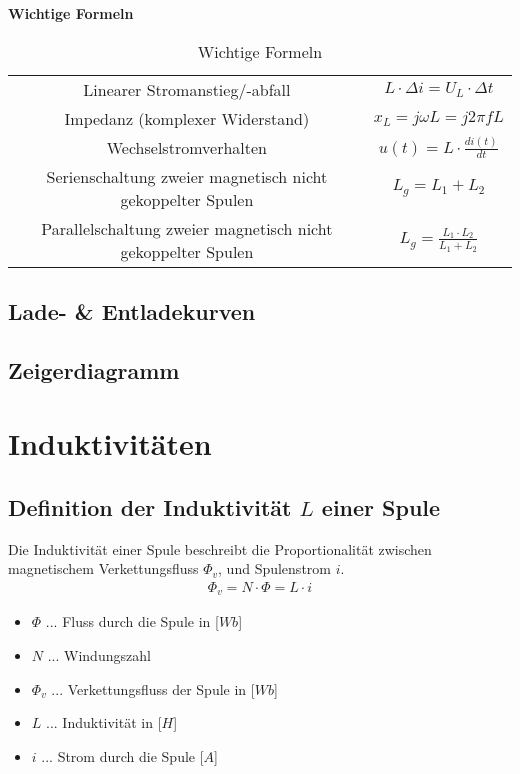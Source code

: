 \textbf{Wichtige Formeln} \\
\begin{table}[!htb]
    \centering
    \begin{tabular}{|c|c|}
        \hline
        Linearer Stromanstieg/-abfall & $L\cdot \Delta i = U_L \cdot \Delta t$ \\
        Impedanz (komplexer Widerstand) & $x_L = j\omega L = j2\pi fL$ \\
        Wechselstromverhalten & $u(t) = L\cdot \frac{di(t)}{dt}$ \\
        Serienschaltung zweier magnetisch nicht gekoppelter Spulen& $L_{g}=L_1+L_2$ \\
        Parallelschaltung zweier magnetisch nicht gekoppelter Spulen& $L_{g}=\frac{L_1\cdot L_2}{L_1+ L_2}$ \\
        \hline
    \end{tabular}
    \caption{Wichtige Formeln}
\end{table}

\subsection{Lade- \& Entladekurven}

\subsection{Zeigerdiagramm}

\newpage

\section{Induktivitäten}
\subsection{Definition der Induktivität $L$ einer Spule}
Die Induktivität einer Spule beschreibt die Proportionalität zwischen magnetischem Verkettungsfluss $\Phi_v$, und Spulenstrom $i$.
\begin{align}
    \Phi_v=N\cdot \Phi = L \cdot i
\end{align}
\begin{itemize}
    \item $\Phi$ ... Fluss durch die Spule in [$Wb$]
    \item $N$ ... Windungszahl
    \item $\Phi_v$ ... Verkettungsfluss der Spule in [$Wb$]
    \item $L$ ... Induktivität in [$H$]
    \item $i$ ... Strom durch die Spule [$A$]
\end{itemize}

